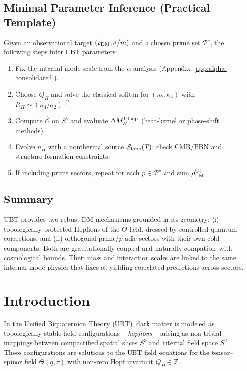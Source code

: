 \subsection{Minimal Parameter Inference (Practical Template)}
Given an observational target $(\rho_{\rm DM}, \sigma/m)$ and a chosen prime set $\mathcal{P}^\star$, the following steps infer UBT parameters:
\begin{enumerate}
\item Fix the internal-mode scale from the $\alpha$ analysis (Appendix~\ref{app:alpha-consolidated}).
\item Choose $Q_H$ and solve the classical soliton for $(\kappa_2,\kappa_4)$ with $R_H\!\sim\!(\kappa_4/\kappa_2)^{1/2}$.
\item Compute $\hat{\mathcal{O}}$ on $S^3$ and evaluate $\Delta M_H^{\rm 1\text{-}loop}$ (heat-kernel or phase-shift methods).
\item Evolve $n_H$ with a nonthermal source $\mathcal{S}_{\rm topo}(T)$; check CMB/BBN and structure-formation constraints.
\item If including prime sectors, repeat for each $p\in\mathcal{P}^\star$ and sum $\rho_{\rm DM}^{(p)}$.
\end{enumerate}

\subsection{Summary}
UBT provides two robust DM mechanisms grounded in its geometry: (i) topologically protected Hopfions of the $\Theta$ field, dressed by controlled quantum corrections, and (ii) orthogonal prime/$p$-adic sectors with their own cold components.
Both are gravitationally coupled and naturally compatible with cosmological bounds. Their mass and interaction scales are linked to the same internal-mode physics that fixes $\alpha$, yielding correlated predictions across sectors.


\section*{Introduction}
In the Unified Biquaternion Theory (UBT), dark matter is modeled as topologically stable field configurations – \emph{hopfions} – arising as non-trivial mappings between compactified spatial slices \(S^3\) and internal field space \(S^2\). These configurations are solutions to the UBT field equations for the tensor–spinor field \(\Theta(q,\tau)\) with non-zero Hopf invariant \(Q_H \in \mathbb{Z}\).

